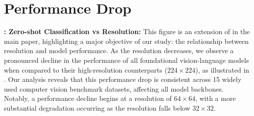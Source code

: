\section{Performance Drop}
\textbf{: Zero-shot Classification vs Resolution:} This figure is an extension of  in the main paper, highlighting a major objective of our study: the relationship between resolution and model performance. As the resolution decreases, we observe a pronounced decline in the performance of all foundational vision-language models when compared to their high-resolution counterparts ($224\times224$), as illustrated in . Our analysis reveals that this performance drop is consistent across 15 widely used computer vision benchmark datasets, affecting all model backbones. Notably, a performance decline begins at a resolution of $64\times64$, with a more substantial degradation occurring as the resolution falls below $32\times32$.


